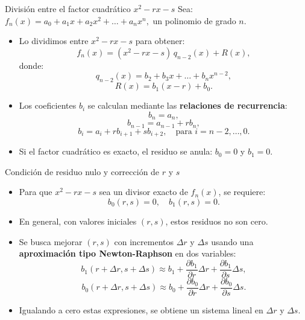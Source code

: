 \documentclass[../../main.tex]{subfiles}
\begin{document}
\begin{frame}{División entre el factor cuadrático \(x^2 - r x - s\)}
  Sea: \(
    f_n(x) = a_0 + a_1 x + a_2 x^2 + \dots + a_n x^n,
  \)
  un polinomio de grado \(n\).

  \begin{itemize}
    \item Lo dividimos entre \(x^2 - r x - s\) para obtener:
      \[
        f_n(x) = (x^2 - r x - s)\, q_{n-2}(x) + R(x),
      \]
      donde:
      \[
        q_{n-2}(x) = b_2 + b_3 x + \dots + b_n x^{n-2},
      \]
      \[
        R(x) = b_1 (x - r) + b_0.
      \]
    \item Los coeficientes \(b_i\) se calculan mediante las \textbf{relaciones de recurrencia}:
      \[
        b_n = a_n,
      \]
      \[
        b_{n-1} = a_{n-1} + r b_n,
      \]
      \[
        b_i = a_i + r b_{i+1} + s b_{i+2}, \quad \text{para } i = n-2,\dots,0.
      \]
    \item Si el factor cuadrático es exacto, el residuo se anula: \(b_0 = 0\) y \(b_1 = 0\).
  \end{itemize}
\end{frame}

\begin{frame}{Condición de residuo nulo y corrección de \(r\) y \(s\)}
  \begin{itemize}
    \item Para que \(x^2 - r x - s\) sea un divisor exacto de \(f_n(x)\),
          se requiere:
      \[
        b_0(r,s) = 0, \quad b_1(r,s) = 0.
      \]
    \item En general, con valores iniciales \((r,s)\), estos residuos no son cero.
    \item Se busca mejorar \((r,s)\) con incrementos \(\Delta r\) y \(\Delta s\)
          usando una \textbf{aproximación tipo Newton-Raphson} en dos variables:
      \[
        b_1(r+\Delta r,s+\Delta s) \approx b_1 +
          \frac{\partial b_1}{\partial r} \Delta r +
          \frac{\partial b_1}{\partial s} \Delta s,
      \]
      \[
        b_0(r+\Delta r,s+\Delta s) \approx b_0 +
          \frac{\partial b_0}{\partial r} \Delta r +
          \frac{\partial b_0}{\partial s} \Delta s.
      \]
    \item Igualando a cero estas expresiones, se obtiene un sistema lineal
          en \(\Delta r\) y \(\Delta s\).
  \end{itemize}
\end{frame}
\end{document}
